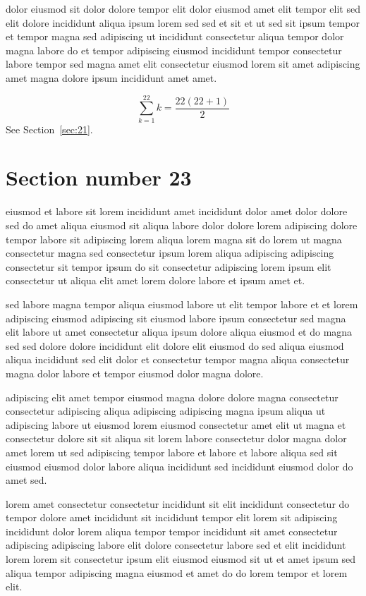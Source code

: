 \documentclass{article}
\begin{document}
dolor eiusmod sit dolor dolore tempor elit dolor eiusmod amet elit tempor elit sed elit dolore incididunt aliqua ipsum lorem sed sed et sit et ut sed sit ipsum tempor et tempor magna sed adipiscing ut incididunt consectetur aliqua tempor dolor magna labore do et tempor adipiscing eiusmod incididunt tempor consectetur labore tempor sed magna amet elit consectetur eiusmod lorem sit amet adipiscing amet magna dolore ipsum incididunt amet amet.

\begin{equation} \sum_{k=1}^{22} k = \frac{22(22+1)}{2} \end{equation}
See Section~\ref{sec:21}.

\section{Section number 23}\label{sec:23}
eiusmod et labore sit lorem incididunt amet incididunt dolor amet dolor dolore sed do amet aliqua eiusmod sit aliqua labore dolor dolore lorem adipiscing dolore tempor labore sit adipiscing lorem aliqua lorem magna sit do lorem ut magna consectetur magna sed consectetur ipsum lorem aliqua adipiscing adipiscing consectetur sit tempor ipsum do sit consectetur adipiscing lorem ipsum elit consectetur ut aliqua elit amet lorem dolore labore et ipsum amet et.

sed labore magna tempor aliqua eiusmod labore ut elit tempor labore et et lorem adipiscing eiusmod adipiscing sit eiusmod labore ipsum consectetur sed magna elit labore ut amet consectetur aliqua ipsum dolore aliqua eiusmod et do magna sed sed dolore dolore incididunt elit dolore elit eiusmod do sed aliqua eiusmod aliqua incididunt sed elit dolor et consectetur tempor magna aliqua consectetur magna dolor labore et tempor eiusmod dolor magna dolore.

adipiscing elit amet tempor eiusmod magna dolore dolore magna consectetur consectetur adipiscing aliqua adipiscing adipiscing magna ipsum aliqua ut adipiscing labore ut eiusmod lorem eiusmod consectetur amet elit ut magna et consectetur dolore sit sit aliqua sit lorem labore consectetur dolor magna dolor amet lorem ut sed adipiscing tempor labore et labore et labore aliqua sed sit eiusmod eiusmod dolor labore aliqua incididunt sed incididunt eiusmod dolor do amet sed.

lorem amet consectetur consectetur incididunt sit elit incididunt consectetur do tempor dolore amet incididunt sit incididunt tempor elit lorem sit adipiscing incididunt dolor lorem aliqua tempor tempor incididunt sit amet consectetur adipiscing adipiscing labore elit dolore consectetur labore sed et elit incididunt lorem lorem sit consectetur ipsum elit eiusmod eiusmod sit ut et amet ipsum sed aliqua tempor adipiscing magna eiusmod et amet do do lorem tempor et lorem elit.
\end{document}
